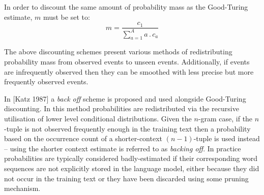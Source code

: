 In order to discount the same amount of probability mass as the
Good-Turing estimate, $m$ must be set to:
\begin{equation}
m = \frac{c_1}{\sum_{a=1}^{A}a\,.\,c_a}
\end{equation}



\label{smoothing_probs}
The above discounting schemes present various methods of
redistributing probability mass from observed events to unseen
events. Additionally, if events are infrequently observed then they
can be smoothed with less precise but more frequently observed events.

In [Katz 1987] a {\it back off} scheme is proposed and used alongside
Good-Turing discounting. In this method probabilities are
redistributed via the recursive utilisation of lower level conditional
distributions. Given the $n$-gram case, if the $n$-tuple is not observed
frequently enough in the training text then a probability based on the
occurrence count of a shorter-context $(n-1)$-tuple is used
instead -- using the shorter context estimate is referred to as
{\it backing off}.
In practice probabilities are typically considered
badly-estimated if their corresponding word sequences are not
explicitly stored in the language model, either because they did not
occur in the training text or they have been discarded using some
pruning mechanism.

